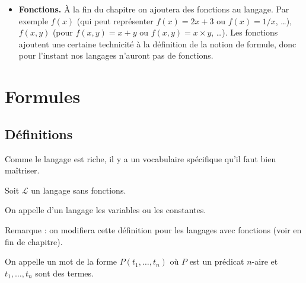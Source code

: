 \documentclass[11pt,class=report,crop=false]{standalone}
\begin{document}
\begin{itemize}
\begin{itemize}
		\item Prédicat $n$-aire $P(x_1,\ldots,x_n)$ (on parle aussi de prédicat à $n$ places).
	\end{itemize}
	Encore une fois, ce qu'est concrètement chaque prédicat devra être précisé dans chaque structure.
	Au niveau du langage c'est juste un symbole $P$, mais on se permettra de le noter $P(x)$ ou $P(x_1,\ldots,x_n)$	afin de clarifier le nombre de places.
	
	
	\item \textbf{Fonctions.}
	À la fin du chapitre on ajoutera des fonctions au langage.
	Par exemple $f(x)$ (qui peut représenter $f(x)=2x+3$ ou $f(x) = 1/x$, \ldots), 
	$f(x,y)$ (pour $f(x,y)=x+y$ ou $f(x,y) = x \times y$, \ldots).
	Les fonctions ajoutent une certaine technicité à la définition de la notion de formule, donc pour l'instant nos langages n'auront pas de fonctions.
\end{itemize}
 

\section{Formules}

\subsection{Définitions}

Comme le langage est riche, il y a un vocabulaire spécifique qu'il faut bien maîtriser.


Soit $\mathcal{L}$ un langage sans fonctions.

\begin{definition}
On appelle  d'un langage les variables ou les constantes.	
\end{definition}

Remarque : on modifiera cette définition pour les langages avec fonctions (voir en fin de chapitre).

\begin{definition}
On appelle  un mot de la forme $P(t_1,\ldots,t_n)$ où $P$ est un prédicat $n$-aire et $t_1, \ldots, t_n$ sont des termes.
\end{definition}
 
\end{document}
